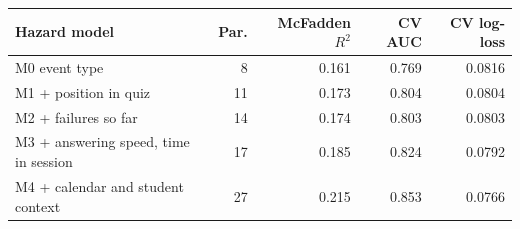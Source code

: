 \begin{tabular}{lrrrr}
\toprule
Hazard model & Par. & McFadden $R^2$ & CV AUC & CV log-loss \\
\midrule
M0 event type & 8 & 0.161 & 0.769 & 0.0816 \\
M1 + position in quiz & 11 & 0.173 & 0.804 & 0.0804 \\
M2 + failures so far & 14 & 0.174 & 0.803 & 0.0803 \\
M3 + answering speed, time in session & 17 & 0.185 & 0.824 & 0.0792 \\
M4 + calendar and student context & 27 & 0.215 & 0.853 & 0.0766 \\
\bottomrule
\end{tabular}
